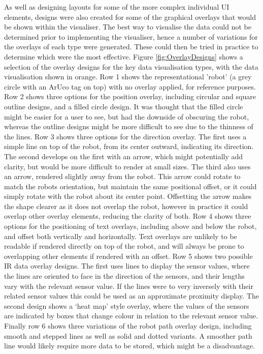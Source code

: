As well as designing layouts for some of the more complex individual UI elements, designs were also created for some of the graphical overlays that would be shown within the visualiser. The best way to visualise the data could not be determined prior to implementing the visualiser, hence a number of variations for the overlays of each type were generated. These could then be tried in practice to determine which were the most effective. Figure \ref{fig:OverlayDesigns} shows a selection of the overlay designs for the key data visualisation types, with the data visualisation shown in orange. Row 1 shows the representational 'robot' (a grey circle with an ArUco tag on top) with no overlay applied, for reference purposes. Row 2 shows three options for the position overlay, including circular and square outline designs, and a filled circle design. It was thought that the filled circle might be easier for a user to see, but had the downside of obscuring the robot, whereas the outline designs might be more difficult to see due to the thinness of the lines. Row 3 shows three options for the direction overlay. The first uses a simple line on top of the robot, from its center outward, indicating its direction. The second develops on the first with an arrow, which might potentially add clarity, but would be more difficult to render at small sizes. The third also uses an arrow, rendered slightly away from the robot. This arrow could rotate to match the robots orientation, but maintain the same positional offset, or it could simply rotate with the robot about its center point. Offsetting the arrow makes the shape clearer as it does not overlap the robot, however in practice it could overlap other overlay elements, reducing the clarity of both. Row 4 shows three options for the positioning of text overlays, including above and below the robot, and offset both vertically and horizontally. Text overlays are unlikely to be readable if rendered directly on top of the robot, and will always be prone to overlapping other elements if rendered with an offset. Row 5 shows two possible IR data overlay designs. The first uses lines to display the sensor values, where the lines are oriented to face in the direction of the sensors, and their lengths vary with the relevant sensor value. If the lines were to very inversely with their related sensor values this could be used as an approximate proximity display. The second design shows a `heat map' style overlay, where the values of the sensors are indicated by boxes that change colour in relation to the relevant sensor value. Finally row 6 shows three variations of the robot path overlay design, including smooth and stepped lines as well as solid and dotted variants. A smoother path line would likely require more data to be stored, which might be a disadvantage.

